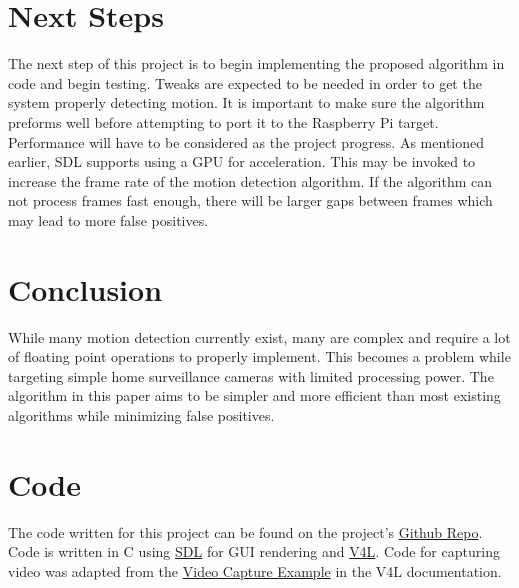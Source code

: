 \documentclass[journal]{IEEEtran}
\begin{document}
    \section{Next Steps}
    The next step of this project is to begin implementing the proposed algorithm in code and begin testing. Tweaks are expected to
    be needed in order to get the system properly detecting motion. It is important to make sure the algorithm preforms well before
    attempting to port it to the Raspberry Pi target. Performance will have to be considered as the project progress. As
    mentioned earlier, SDL supports using a GPU for acceleration. This may be invoked to increase the frame rate of the motion
    detection algorithm. If the algorithm can not process frames fast enough, there will be larger gaps between frames which may
    lead to more false positives.

    \section{Conclusion}
    While many motion detection currently exist, many are complex and require a lot of floating point operations to properly
    implement. This becomes a problem while targeting simple home surveillance cameras with limited processing power. The algorithm
    in this paper aims to be simpler and more efficient than most existing algorithms while minimizing false positives.

    \appendices
    \section{Code}
    The code written for this project can be found on the project's
    \href{https://github.com/joeyahines/motion_detector}{Github Repo}. Code is written in C using \href{https://www.libsdl.org/}{SDL} for GUI rendering and \href{https://www.linuxtv.org/downloads/v4l-dvb-apis-new/uapi/v4l/v4l2.html}{V4L}. Code for capturing
    video was adapted from the \href{https://www.linuxtv.org/downloads/v4l-dvb-apis-new/uapi/v4l/capture.c.html}{Video Capture Example} in the V4L documentation.


    \ifCLASSOPTIONcaptionsoff
    \newpage
    \fi





    
    
\end{document}
